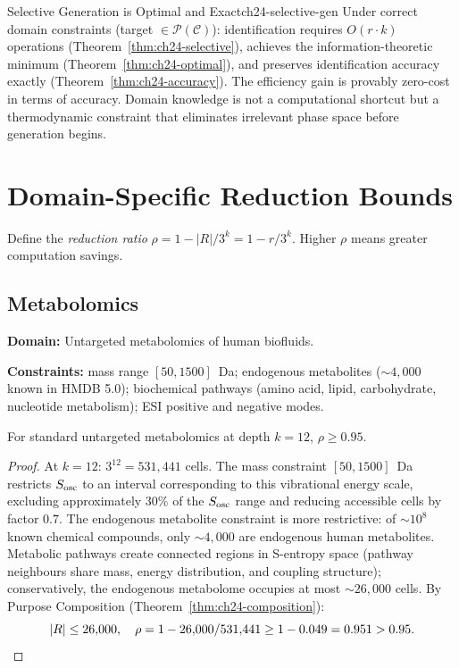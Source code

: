 \begin{consequence}{Selective Generation is Optimal and Exact}{ch24-selective-gen}
Under correct domain constraints (target $\in \mathcal{P}(\mathcal{C})$):
identification requires $O(r \cdot k)$ operations
(Theorem~\ref{thm:ch24-selective}), achieves the information-theoretic
minimum (Theorem~\ref{thm:ch24-optimal}), and preserves identification accuracy
exactly (Theorem~\ref{thm:ch24-accuracy}).  The efficiency gain is provably
zero-cost in terms of accuracy.  Domain knowledge is not a computational
shortcut but a thermodynamic constraint that eliminates irrelevant phase space
before generation begins.
\end{consequence}

\section{Domain-Specific Reduction Bounds}
\label{sec:ch24-domain-bounds}

Define the \emph{reduction ratio} $\rho = 1 - |R|/3^k = 1 - r/3^k$.
Higher $\rho$ means greater computation savings.

\subsection{Metabolomics}
\label{sec:ch24-metab}

\noindent\textbf{Domain:} Untargeted metabolomics of human biofluids.

\noindent\textbf{Constraints:}
mass range $[50, 1500]$~Da;
endogenous metabolites ($\sim 4{,}000$ known in HMDB 5.0);
biochemical pathways (amino acid, lipid, carbohydrate, nucleotide metabolism);
ESI positive and negative modes.

\begin{theorem}
\label{thm:ch24-metab}
For standard untargeted metabolomics at depth $k = 12$,
$\rho \geq 0.95$.
\end{theorem}

\begin{proof}
At $k = 12$: $3^{12} = 531{,}441$ cells.  The mass constraint $[50, 1500]$~Da
restricts $S_{\mathrm{osc}}$ to an interval corresponding to this vibrational energy scale,
excluding approximately 30\% of the $S_{\mathrm{osc}}$ range and reducing accessible cells
by factor $0.7$.  The endogenous metabolite constraint is more restrictive:
of $\sim 10^8$ known chemical compounds, only $\sim 4{,}000$ are endogenous
human metabolites.  Metabolic pathways create connected regions in S-entropy
space (pathway neighbours share mass, energy distribution, and coupling
structure); conservatively, the endogenous metabolome occupies at most
$\sim 26{,}000$ cells.  By Purpose Composition
(Theorem~\ref{thm:ch24-composition}):
\[
  |R| \leq 26{,}000,
  \quad
  \rho = 1 - 26{,}000/531{,}441 \geq 1 - 0.049 = 0.951 > 0.95. \qedhere
\]
\end{proof}

